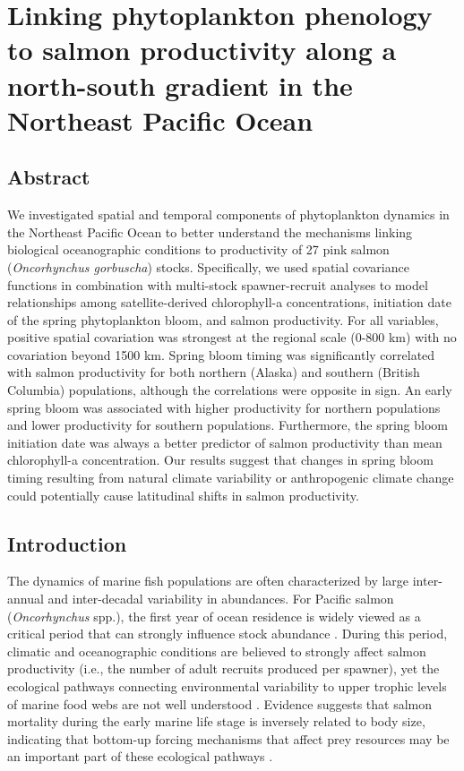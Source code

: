\chapter{Linking phytoplankton phenology to salmon productivity along a
north-south gradient in the Northeast Pacific Ocean}


\section{Abstract}

We investigated spatial and temporal components of phytoplankton dynamics in the
Northeast Pacific Ocean to better understand the mechanisms linking biological
oceanographic conditions to productivity of 27 pink salmon (\emph{Oncorhynchus
gorbuscha}) stocks. Specifically, we used spatial covariance functions in
combination with multi-stock spawner-recruit analyses to model relationships
among satellite-derived chlorophyll-a concentrations, initiation date of the
spring phytoplankton bloom, and salmon productivity. For all variables, positive
spatial covariation was strongest at the regional scale (0-800 km) with no
covariation beyond 1500 km. Spring bloom timing was significantly correlated
with salmon productivity for both northern (Alaska) and southern (British
Columbia) populations, although the correlations were opposite in sign. An early
spring bloom was associated with higher productivity for northern populations
and lower productivity for southern populations. Furthermore, the spring bloom
initiation date was always a better predictor of salmon productivity than mean
chlorophyll-a concentration. Our results suggest that changes in spring bloom
timing resulting from natural climate variability or anthropogenic climate
change could potentially cause latitudinal shifts in salmon productivity.


\section{Introduction}

The dynamics of marine fish populations are often characterized by large
inter-annual and inter-decadal variability in abundances. For Pacific salmon
(\emph{Oncorhynchus} spp.), the first year of ocean residence is widely viewed
as a critical period that can strongly influence stock abundance
\citep{Peterman1985a, Parker1968a, Wertheimer2007a}. During this period,
climatic and oceanographic conditions are believed to strongly affect salmon
productivity (i.e., the number of adult recruits produced per spawner), yet the
ecological pathways connecting environmental variability to upper trophic levels
of marine food webs are not well understood \citep{Drinkwater2010a,
Ottersen2010a}. Evidence suggests that salmon mortality during the early marine
life stage is inversely related to body size, indicating that bottom-up forcing
mechanisms that affect prey resources may be an important part of these
ecological pathways \citep{McGurk1996a, Duffy2011, Farley2007b}.

